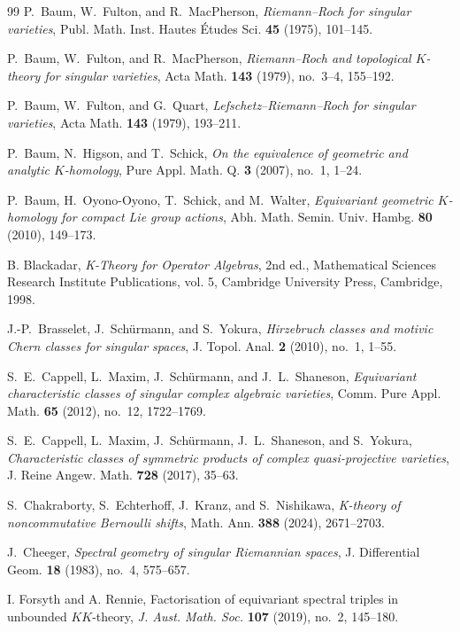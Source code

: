 \documentclass[11pt,leqno,twoside]{amsart}
\theoremstyle{plainsl}
\theoremstyle{definition}
\begin{document}
\begin{thebibliography}{99}
P.~Baum, W.~Fulton, and R.~MacPherson,
\emph{Riemann--Roch for singular varieties},
Publ. Math. Inst. Hautes \'Etudes Sci. \textbf{45} (1975), 101--145.

P.~Baum, W.~Fulton, and R.~MacPherson,
\emph{Riemann--Roch and topological $K$-theory for singular varieties},
Acta Math. \textbf{143} (1979), no.~3--4, 155--192.

P.~Baum, W.~Fulton, and G.~Quart,
\emph{Lefschetz--Riemann--Roch for singular varieties},
Acta Math. \textbf{143} (1979), 193--211.

P.~Baum, N.~Higson, and T.~Schick,
\emph{On the equivalence of geometric and analytic $K$-homology},
Pure Appl. Math. Q. \textbf{3} (2007), no.~1, 1--24.

P.~Baum, H.~Oyono-Oyono, T.~Schick, and M.~Walter,
\emph{Equivariant geometric $K$-homology for compact Lie group actions},
Abh. Math. Semin. Univ. Hambg. \textbf{80} (2010), 149--173.

B. Blackadar,
\emph{K-Theory for Operator Algebras},
2nd ed., Mathematical Sciences Research Institute
Publications, vol. 5,
Cambridge University Press, Cambridge, 1998.


J.-P.~Brasselet, J.~Sch\"urmann, and S.~Yokura,
\emph{Hirzebruch classes and motivic Chern classes for singular spaces},
J. Topol. Anal. \textbf{2} (2010), no.~1, 1--55.

S.~E.~Cappell, L.~Maxim, J.~Sch\"urmann,
and J.~L.~Shaneson,
\emph{Equivariant characteristic classes of
singular complex algebraic varieties},
Comm. Pure Appl. Math. \textbf{65} (2012),
no.~12, 1722--1769.

S.~E.~Cappell, L.~Maxim, J.~Sch\"urmann, J.~L.~Shaneson, and S.~Yokura,
\emph{Characteristic classes of symmetric products of complex quasi-projective varieties},
J. Reine Angew. Math. \textbf{728} (2017), 35--63.

S.~Chakraborty, S.~Echterhoff, J.~Kranz, and S.~Nishikawa,
\textit{K-theory of noncommutative Bernoulli shifts},
Math. Ann. \textbf{388} (2024), 2671--2703.

J.~Cheeger,
\emph{Spectral geometry of singular Riemannian spaces},
J. Differential Geom. \textbf{18} (1983), no.~4, 575--657.






I. Forsyth and A. Rennie,
Factorisation of equivariant spectral triples in unbounded
$KK$-theory,
\textit{J. Aust. Math. Soc.} \textbf{107} (2019),
no.~2, 145--180.




\end{thebibliography}
\end{document}
